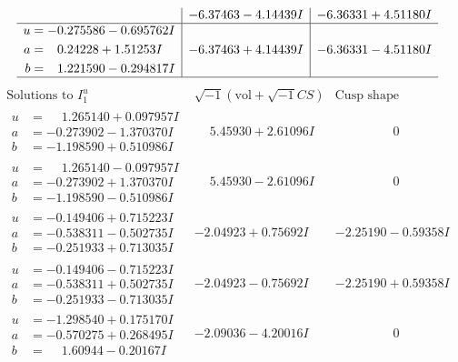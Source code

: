 \documentclass[1p]{elsarticle_modified}
\theoremstyle{definition}
\newcommand{\I}{\sqrt{-1}}
\begin{document}
$$\begin{array}{c|c|c}
 & -6.37463 - 4.14439 I & -6.36331 + 4.51180 I \\ \hline\begin{aligned}
u &= -0.275586 - 0.695762 I \\
a &= \phantom{-}0.24228 + 1.51253 I \\
b &= \phantom{-}1.221590 - 0.294817 I\end{aligned}
 & -6.37463 + 4.14439 I & -6.36331 - 4.51180 I\\
 \hline 
 \end{array}$$\newpage$$\begin{array}{c|c|c}  
\text{Solutions to }I^u_{1}& \I (\text{vol} + \sqrt{-1}CS) & \text{Cusp shape}\\
 \hline 
\begin{aligned}
u &= \phantom{-}1.265140 + 0.097957 I \\
a &= -0.273902 - 1.370370 I \\
b &= -1.198590 + 0.510986 I\end{aligned}
 & \phantom{-}5.45930 + 2.61096 I & \phantom{-0.000000 } 0 \\ \hline\begin{aligned}
u &= \phantom{-}1.265140 - 0.097957 I \\
a &= -0.273902 + 1.370370 I \\
b &= -1.198590 - 0.510986 I\end{aligned}
 & \phantom{-}5.45930 - 2.61096 I & \phantom{-0.000000 } 0 \\ \hline\begin{aligned}
u &= -0.149406 + 0.715223 I \\
a &= -0.538311 - 0.502735 I \\
b &= -0.251933 + 0.713035 I\end{aligned}
 & -2.04923 + 0.75692 I & -2.25190 - 0.59358 I \\ \hline\begin{aligned}
u &= -0.149406 - 0.715223 I \\
a &= -0.538311 + 0.502735 I \\
b &= -0.251933 - 0.713035 I\end{aligned}
 & -2.04923 - 0.75692 I & -2.25190 + 0.59358 I \\ \hline\begin{aligned}
u &= -1.298540 + 0.175170 I \\
a &= -0.570275 + 0.268495 I \\
b &= \phantom{-}1.60944 - 0.20167 I\end{aligned}
 & -2.09036 - 4.20016 I & \phantom{-0.000000 } 0 \\ \hline\begin{aligned}

\end{aligned}
\end{array}$$
\end{document}
